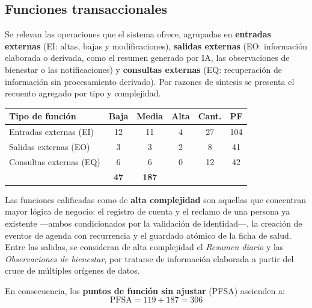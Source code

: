 \documentclass[a4paper,12pt]{article}
\begin{document}
    \subsection{Funciones transaccionales}
    \par Se relevan las operaciones que el sistema ofrece, agrupadas en \textbf{entradas externas} (EI: altas, bajas y modificaciones), \textbf{salidas externas} (EO: información elaborada o derivada, como el resumen generado por IA, las observaciones de bienestar o las notificaciones) y \textbf{consultas externas} (EQ: recuperación de información sin procesamiento derivado). Por razones de síntesis se presenta el recuento agregado por tipo y complejidad.
    \begin{center}
        \begin{tabular}{ |p{5cm}|c|c|c|c|c| }
            \hline
            \rowcolor{lightgray} \textbf{Tipo de función} & \textbf{Baja} & \textbf{Media} & \textbf{Alta} & \textbf{Cant.} & \textbf{PF} \\
            \hline
            Entradas externas (EI) & 12 & 11 & 4 & 27 & 104 \\
            \hline
            Salidas externas (EO) & 3 & 3 & 2 & 8 & 41 \\
            \hline
            Consultas externas (EQ) & 6 & 6 & 0 & 12 & 42 \\
            \hline
            \rowcolor{lightgray} \multicolumn{4}{ |r| }{\textbf{Subtotal funciones transaccionales}} & \textbf{47} & \textbf{187} \\
            \hline
        \end{tabular}
    \end{center}
    \par Las funciones calificadas como de \textbf{alta complejidad} son aquellas que concentran mayor lógica de negocio: el registro de cuenta y el reclamo de una persona ya existente —ambos condicionados por la validación de identidad—, la creación de eventos de agenda con recurrencia y el guardado atómico de la ficha de salud. Entre las salidas, se consideran de alta complejidad el \textit{Resumen diario} y las \textit{Observaciones de bienestar}, por tratarse de información elaborada a partir del cruce de múltiples orígenes de datos.
    \par En consecuencia, los \textbf{puntos de función sin ajustar} (PFSA) ascienden a:
    \[ \mathrm{PFSA} = 119 + 187 = 306 \]
\end{document}
